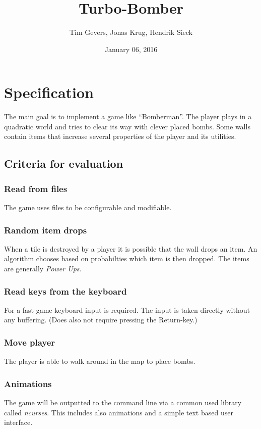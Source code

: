 \documentclass{article}
\title{Turbo-Bomber}
\date{January 06, 2016}
\author{Tim Gevers, Jonas Krug, Hendrik Sieck}
\begin{document}
	\maketitle
	\newpage
	
	\tableofcontents
	\newpage
	
	
	\section{Specification}
		The main goal is to implement a game like ``Bomberman''. The player plays in a quadratic world and tries to clear its way with clever placed bombs. Some walls contain items that increase several properties of the player and its utilities.
		
		\subsection{Criteria for evaluation}
			\subsubsection{Read from files}
				The game uses files to be configurable and modifiable.
			
			\subsubsection{Random item drops}
				When a tile is destroyed by a player it is possible that the wall drops an item. An algorithm chooses based on probabilties which item is then dropped. The items are generally \emph{Power Ups}.
			
			\subsubsection{Read keys from the keyboard}
				For a fast game keyboard input is required. The input is taken directly without any buffering. (Does also not require pressing the Return-key.)
			
			\subsubsection{Move player}
				The player is able to walk around in the map to place bombs.
			
			\subsubsection{Animations}
				The game will be outputted to the command line via a common used library called \emph{ncurses}. This includes also animations and a simple text based user interface.
			
\end{document}
